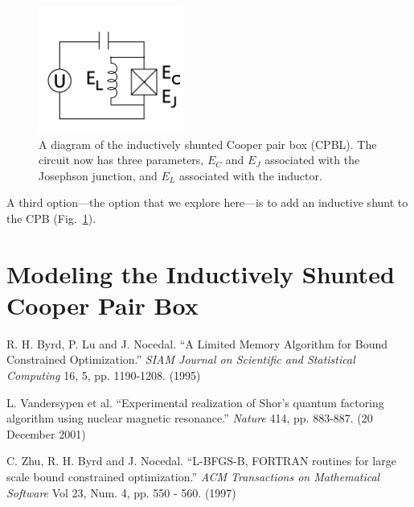 \documentclass[twocolumn]{revtex4}
\newcommand{\picwidth}{0.66\linewidth}
\begin{document}
\begin{figure}
  \includegraphics[width=\picwidth]{CPBL-circuit.png}
  \caption{ A diagram of the inductively shunted Cooper pair box
    (CPBL). The circuit now has three parameters, $E_C$ and $E_J$
    associated with the Josephson junction, and $E_L$ associated with
    the inductor.}
  \label{CPBL-circuit}
\end{figure}

A third option---the option that we explore here---is to add an
inductive shunt to the CPB (Fig.\ \ref{CPBL-circuit}).

\section{Modeling the Inductively Shunted Cooper Pair Box}


\begin{thebibliography}{9}
 R. H. Byrd, P. Lu and J. Nocedal. ``A Limited Memory
  Algorithm for Bound Constrained Optimization.'' \textit{SIAM Journal
    on Scientific and Statistical Computing} 16, 5,
  pp. 1190-1208. (1995)
  
 L. Vandersypen et al. ``Experimental realization
  of Shor's quantum factoring algorithm using nuclear magnetic
  resonance.'' \textit{Nature} 414, pp. 883-887. (20 December 2001)
  
 C. Zhu, R. H. Byrd and J. Nocedal. ``L-BFGS-B, FORTRAN
  routines for large scale bound constrained optimization.''
  \textit{ACM Transactions on Mathematical Software} Vol 23, Num. 4,
  pp. 550 - 560. (1997)

\end{thebibliography}
\end{document}
